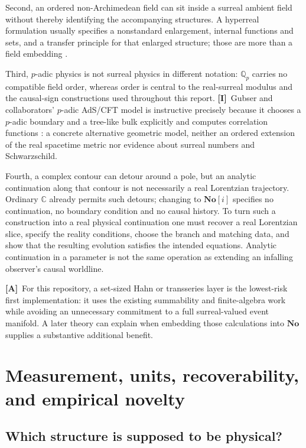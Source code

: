 \documentclass[11pt,letterpaper]{article}
\numberwithin{equation}{section}
\theoremstyle{definition}
\theoremstyle{remark}
\newcommand{\No}{\mathbf{No}}
\newcommand{\SC}{\mathbf{No}[i]}
\newcommand{\C}{\mathbb C}
\newcommand{\Q}{\mathbb Q}
\newcommand{\TA}{\textcolor{TierA}{\textsf{\bfseries[A]}}}
\newcommand{\TI}{\textcolor{TierI}{\textsf{\bfseries[I]}}}
\begin{document}
Second, an ordered non-Archimedean field can sit inside a surreal ambient
field without thereby identifying the accompanying structures. A hyperreal
formulation usually specifies a nonstandard enlargement, internal functions and
sets, and a transfer principle for that enlarged structure; those are more than
a field embedding \cite{phys:Ehrlich,phys:Loeb}.

Third, $p$-adic physics is not surreal physics in different notation: $\Q_{p}$
carries no compatible field order, whereas order is central to the real-surreal
modulus and the causal-sign constructions used throughout this report.
\TI\ Gubser and collaborators' $p$-adic AdS/CFT model is instructive precisely
because it chooses a $p$-adic boundary and a tree-like bulk explicitly and
computes correlation functions \cite{phys:Padic}: a concrete alternative
geometric model, neither an ordered extension of the real spacetime metric nor
evidence about surreal numbers and Schwarzschild.

Fourth, a complex contour can detour around a pole, but an analytic
continuation along that contour is not necessarily a real Lorentzian
trajectory. Ordinary $\C$ already permits such detours; changing to $\SC$
specifies no continuation, no boundary condition and no causal history. To turn
such a construction into a real physical continuation one must recover a real
Lorentzian slice, specify the reality conditions, choose the branch and
matching data, and show that the resulting evolution satisfies the intended
equations. Analytic continuation in a parameter is not the same operation as
extending an infalling observer's causal worldline.

\TA\ For this repository, a set-sized Hahn or transseries layer is the
lowest-risk first implementation: it uses the existing summability and
finite-algebra work while avoiding an unnecessary commitment to a full
surreal-valued event manifold. A later theory can explain when embedding those
calculations into $\No$ supplies a substantive additional benefit.

\section{Measurement, units, recoverability, and empirical novelty}
\label{phys:sec:measurement}

\subsection{Which structure is supposed to be physical?}
\label{phys:sub:whichstructure}
\end{document}
